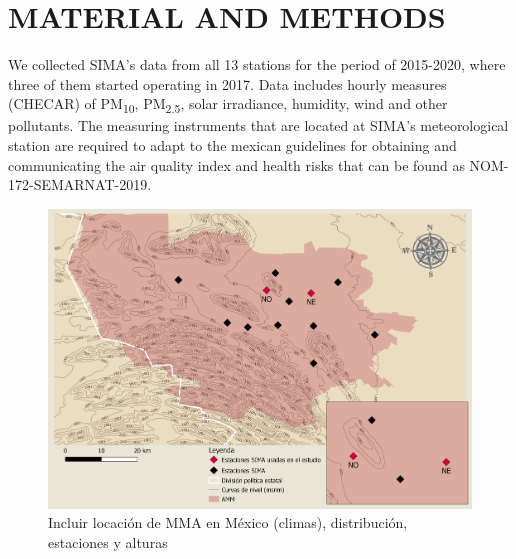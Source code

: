 \section{MATERIAL AND METHODS}

We collected SIMA’s data from all 13 stations for the period of 2015-2020, where three of them
started operating in 2017. Data includes hourly measures (CHECAR) of PM\textsubscript{10}, PM\textsubscript{2.5},
solar irradiance, humidity, wind and other pollutants. The measuring instruments that are located at SIMA’s
meteorological station are required to adapt to the mexican guidelines for obtaining and communicating the
air quality index and health risks that can be found as NOM-172-SEMARNAT-2019.
\begin{figure}[H]
    \centering
    \includegraphics[scale=0.15]{images/map.png}
    \caption{Incluir locación de MMA en México (climas), distribución, estaciones y alturas}
    \label{fig:map}
\end{figure}
